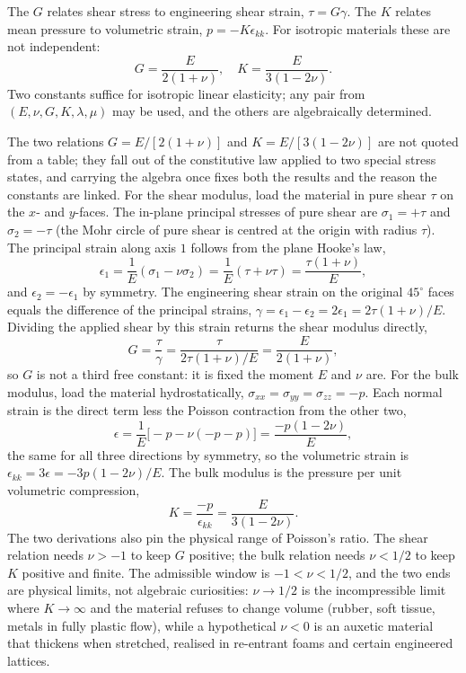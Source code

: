 

The  $G$ relates shear stress to engineering
shear strain, $\tau = G \gamma$. The  $K$
relates mean pressure to volumetric strain, $p = -K \epsilon_{kk}$.
For isotropic materials these are not independent:
\[
G = \frac{E}{2(1+\nu)}, \quad K = \frac{E}{3(1-2\nu)}.
\]
Two constants suffice for isotropic linear elasticity; any pair from
$(E, \nu, G, K, \lambda, \mu)$ may be used, and the others are
algebraically determined.

The two relations $G = E/[2(1+\nu)]$ and $K = E/[3(1-2\nu)]$ are not
quoted from a table; they fall out of the constitutive law applied to
two special stress states, and carrying the algebra once fixes both the
results and the reason the constants are linked. For the shear modulus,
load the material in pure shear $\tau$ on the $x$- and $y$-faces. The
in-plane principal stresses of pure shear are $\sigma_1 = +\tau$ and
$\sigma_2 = -\tau$ (the Mohr circle of pure shear is centred at the
origin with radius $\tau$). The principal strain along axis $1$ follows
from the plane Hooke's law,
\[
\epsilon_1 = \frac{1}{E}(\sigma_1 - \nu\sigma_2) = \frac{1}{E}(\tau +
\nu\tau) = \frac{\tau(1+\nu)}{E},
\]
and $\epsilon_2 = -\epsilon_1$ by symmetry. The engineering shear strain
on the original $45^\circ$ faces equals the difference of the principal
strains, $\gamma = \epsilon_1 - \epsilon_2 = 2\epsilon_1 = 2\tau(1+\nu)/
E$. Dividing the applied shear by this strain returns the shear modulus
directly,
\[
G = \frac{\tau}{\gamma} = \frac{\tau}{2\tau(1+\nu)/E} = \frac{E}{2(1+
\nu)},
\]
so $G$ is not a third free constant: it is fixed the moment $E$ and
$\nu$ are. For the bulk modulus, load the material hydrostatically,
$\sigma_{xx} = \sigma_{yy} = \sigma_{zz} = -p$. Each normal strain is the
direct term less the Poisson contraction from the other two,
\[
\epsilon = \frac{1}{E}\big[-p - \nu(-p - p)\big] = \frac{-p(1 - 2\nu)}
{E},
\]
the same for all three directions by symmetry, so the volumetric strain
is $\epsilon_{kk} = 3\epsilon = -3p(1-2\nu)/E$. The bulk modulus is the
pressure per unit volumetric compression,
\[
K = \frac{-p}{\epsilon_{kk}} = \frac{E}{3(1 - 2\nu)}.
\]
The two derivations also pin the physical range of Poisson's ratio. The
shear relation needs $\nu > -1$ to keep $G$ positive; the bulk relation
needs $\nu < 1/2$ to keep $K$ positive and finite. The admissible window
is $-1 < \nu < 1/2$, and the two ends are physical limits, not algebraic
curiosities: $\nu \to 1/2$ is the incompressible limit where $K \to
\infty$ and the material refuses to change volume (rubber, soft tissue,
metals in fully plastic flow), while a hypothetical $\nu < 0$ is an
auxetic material that thickens when stretched, realised in re-entrant
foams and certain engineered lattices.

